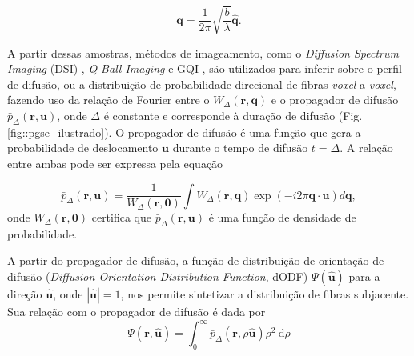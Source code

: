 \documentclass[
    12pt,                %
    oneside,            %
    a4paper,            %
    english,            %
    french,                %
    spanish,            %
    brazil                %
    ]{abntex2}
\begin{document}
\begin{equation}
\label{eq::qspace_bvalue}
\mathbf{q} = \frac{1}{2\pi}\sqrt{\frac{b}{\lambda}} \mathbf{\hat{q}}.
\end{equation}

A partir dessas amostras, métodos de imageamento, como o \textit{Diffusion Spectrum Imaging} (DSI) \cite{wedeen2005}, \textit{Q-Ball Imaging} \cite{TuchQBall2004} e GQI \cite{yeh2010}, são utilizados para inferir sobre o perfil de difusão, ou a distribuição de probabilidade direcional de fibras \textit{voxel} a \textit{voxel}, fazendo uso da relação de Fourier entre o $W_{\Delta}(\mathbf{r}, \mathbf{q})$ e o propagador de difusão $\bar{p}_{\Delta}(\mathbf{r}, \mathbf{u})$, onde $\Delta$ é constante e corresponde à duração de difusão (Fig. \ref{fig::pgse_ilustrado}). O propagador de difusão é uma função que gera a probabilidade de deslocamento $\mathbf{u}$ durante o tempo de difusão $t = \Delta$. A relação entre ambas pode ser expressa pela equação \cite{tuch2002}


\begin{equation}
\label{eq::propagator}
    \bar{p}_{\Delta}(\mathbf{r}, \mathbf{u}) =\frac{1}{W_{\Delta}(\mathbf{r},\mathbf{0}) } \int W_{\Delta}(\mathbf{r},\mathbf{q}) \exp (-i2 \pi \mathbf{q} \cdot \mathbf{u}) d \mathbf{q} ,
\end{equation}
onde $W_{\Delta}(\mathbf{r},\mathbf{0})$ certifica que $\bar{p}_{\Delta}(\mathbf{r}, \mathbf{u})$ é uma função de densidade de probabilidade.




A partir do propagador de difusão, a função de distribuição de orientação de difusão (\textit{Diffusion Orientation Distribution Function}, dODF) $\Psi(\mathbf{\hat{u}})$ para a direção $\mathbf{\hat{u}}$, onde $|\mathbf{\hat{u}}| = 1$,  nos permite sintetizar a distribuição de fibras subjacente. Sua relação com o propagador de difusão é dada por \cite{tuch2002}
\begin{equation}
\label{eq::dodf_propagador}
\Psi(\mathbf{\mathbf{r},\hat{u}})=\int_{0}^{\infty} \bar{p}_{\Delta}(\mathbf{r}, \rho  \mathbf{\hat{u}}) \rho^2 \mathrm{~d}\rho
\end{equation}
\end{document}
